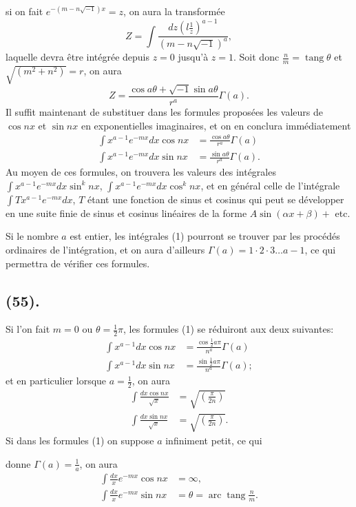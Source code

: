 \documentclass{article}
\begin{document}
si on fait $e^{-(m-n\sqrt{-1})x}=z$, on aura la transformée
\[ Z=\int\frac{dz\left(l\frac{1}{z}\right)^{a-1}}{(m-n\sqrt{-1})^{a}}, \]
laquelle devra être intégrée depuis $z=0$ jusqu'à $z=1$. Soit donc $\frac{n}{m}=\operatorname{tang}\theta$ et $\sqrt{(m^{2}+n^{2})}=r$, on aura
\[ Z=\frac{\cos a\theta+\sqrt{-1}\sin a\theta}{r^{a}}\Gamma(a). \]
Il suffit maintenant de substituer dans les formules proposées les valeurs de $\cos nx$ et $\sin nx$ en exponentielles imaginaires, et on en conclura immédiatement
\[ \begin{aligned} \int x^{a-1}e^{-mx}dx\cos nx&=\frac{\cos a\theta}{r^{a}}\Gamma(a)\\ \int x^{a-1}e^{-mx}dx\sin nx&=\frac{\sin a\theta}{r^{a}}\Gamma(a). \end{aligned} \tag{1} \]
Au moyen de ces formules, on trouvera les valeurs des intégrales $\displaystyle\int x^{a-1}e^{-mx}dx\sin^{k}nx$, $\displaystyle\int x^{a-1}e^{-mx}dx\cos^{k}nx$, et en général celle de l'intégrale $\displaystyle\int Tx^{a-1}e^{-mx}dx$, $T$ étant une fonction de sinus et cosinus qui peut se développer en une suite finie de sinus et cosinus linéaires de la forme $A\sin(\alpha x+\beta)+$ etc.

Si le nombre $a$ est entier, les intégrales (1) pourront se trouver par les procédés ordinaires de l'intégration, et on aura d'ailleurs $\Gamma(a)=1\cdot2\cdot3\ldots a-1$, ce qui permettra de vérifier ces formules.

\subsection*{(55).}

Si l'on fait $m=0$ ou $\theta=\frac{1}{2}\pi$, les formules (1) se réduiront aux deux suivantes:
\[ \begin{aligned} \int x^{a-1}dx\cos nx&=\frac{\cos\frac{1}{2}a\pi}{n^{a}}\Gamma(a)\\ \int x^{a-1}dx\sin nx&=\frac{\sin\frac{1}{2}a\pi}{n^{a}}\Gamma(a); \end{aligned} \tag{2} \]
et en particulier lorsque $a=\frac{1}{2}$, on aura
\[ \begin{aligned} \int\frac{dx\cos nx}{\sqrt{x}}&=\sqrt{\left(\frac{\pi}{2n}\right)}\\ \int\frac{dx\sin nx}{\sqrt{x}}&=\sqrt{\left(\frac{\pi}{2n}\right)}. \end{aligned} \tag{3} \]
Si dans les formules (1) on suppose $a$ infiniment petit, ce qui

donne $\Gamma(a)=\frac{1}{a}$, on aura
\[ \begin{aligned} \int\frac{dx}{x}e^{-mx}\cos nx&=\infty,\\ \int\frac{dx}{x}e^{-mx}\sin nx&=\theta=\operatorname{arc}\operatorname{tang}\frac{n}{m}. \end{aligned} \tag{4} \]
\end{document}
